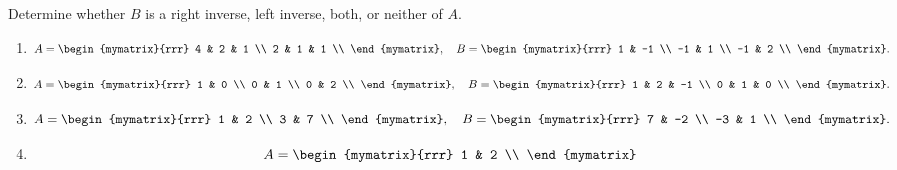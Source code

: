 \begin{enumialphparenastyle}
\begin{ex}
  Determine whether $B$ is a right inverse, left inverse, both, or
  neither of $A$.
  \begin{enumerate}
  \item
    \begin{equation*}
      A = \begin{mymatrix}{rrr}
        4 & 2 & 1 \\
        2 & 1 & 1 \\
      \end{mymatrix},
      \quad
      B = \begin{mymatrix}{rrr}
        1 & -1 \\
        -1 & 1 \\
        -1 & 2 \\
      \end{mymatrix}.
    \end{equation*}
  \item
    \begin{equation*}
      A = \begin{mymatrix}{rrr}
        1 & 0 \\
        0 & 1 \\
        0 & 2 \\
      \end{mymatrix},
      \quad
      B = \begin{mymatrix}{rrr}
        1 & 2 & -1 \\
        0 & 1 & 0 \\
      \end{mymatrix}.
    \end{equation*}
  \item
    \begin{equation*}
      A = \begin{mymatrix}{rrr}
        1 & 2 \\
        3 & 7 \\
      \end{mymatrix},
      \quad
      B = \begin{mymatrix}{rrr}
        7 & -2 \\
        -3 & 1 \\
      \end{mymatrix}.
    \end{equation*}
  \item
    \begin{equation*}
      A = \begin{mymatrix}{rrr}
        1 & 2 \\

\end{mymatrix}
\end{equation*}
\end{enumerate}
\end{ex}
\end{enumialphparenastyle}
